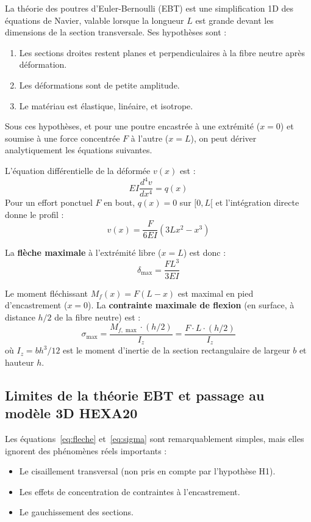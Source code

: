 \documentclass[journal, a4paper, twocolumn]{IEEEtran}
\begin{document}
La théorie des poutres d'Euler-Bernoulli (EBT) est une simplification 1D des équations de Navier, valable lorsque la longueur $L$ est grande devant les dimensions de la section transversale. Ses hypothèses sont :
\begin{enumerate}[label=\textbf{H\arabic*}.]
    \item Les sections droites restent planes et perpendiculaires à la fibre neutre après déformation.
    \item Les déformations sont de petite amplitude.
    \item Le matériau est élastique, linéaire, et isotrope.
\end{enumerate}

Sous ces hypothèses, et pour une poutre encastrée à une extrémité ($x=0$) et soumise à une force concentrée $F$ à l'autre ($x=L$), on peut dériver analytiquement les équations suivantes.

L'équation différentielle de la déformée $v(x)$ est :
\begin{equation}
    EI \frac{d^4 v}{dx^4} = q(x)
\end{equation}
Pour un effort ponctuel $F$ en bout, $q(x)=0$ sur $[0,L[$ et l'intégration directe donne le profil :
\begin{equation}
    v(x) = \frac{F}{6EI}\left(3Lx^2 - x^3\right)
\end{equation}

La \textbf{flèche maximale} à l'extrémité libre ($x=L$) est donc :
\begin{equation}
    \boxed{\delta_{\max} = \frac{F L^3}{3EI}}
    \label{eq:fleche}
\end{equation}

Le moment fléchissant $M_f(x) = F(L-x)$ est maximal en pied d'encastrement ($x=0$). La \textbf{contrainte maximale de flexion} (en surface, à distance $h/2$ de la fibre neutre) est :
\begin{equation}
    \boxed{\sigma_{\max} = \frac{M_{f,\max} \cdot (h/2)}{I_z} = \frac{F \cdot L \cdot (h/2)}{I_z}}
    \label{eq:sigma}
\end{equation}
où $I_z = bh^3/12$ est le moment d'inertie de la section rectangulaire de largeur $b$ et hauteur $h$.

\subsection{Limites de la théorie EBT et passage au modèle 3D HEXA20}

Les équations~\eqref{eq:fleche} et~\eqref{eq:sigma} sont remarquablement simples, mais elles ignorent des phénomènes réels importants :
\begin{itemize}
    \item Le cisaillement transversal (non pris en compte par l'hypothèse H1).
    \item Les effets de concentration de contraintes à l'encastrement.
    \item Le gauchissement des sections.
\end{itemize}
\end{document}
